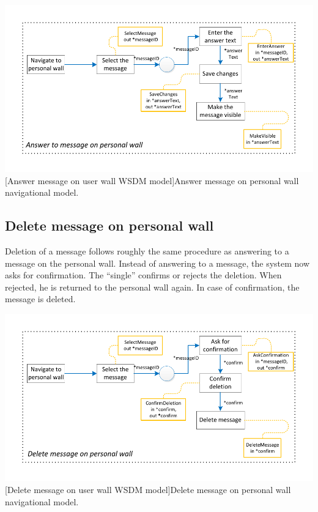 \documentclass[11pt, a4paper,svglistings,oneside]{book}
\begin{document}
$\;$ \\
\noindent\begin{minipage}{\textwidth}
    \centering
   \includegraphics[scale=1]{nav_AnswerMessagePersonalWall.pdf}
 [Answer message on user wall WSDM model]{Answer message on personal wall navigational model.}
\end{minipage}

\subsection{Delete message on personal wall}

Deletion of a message follows roughly the same procedure as answering to a message on the personal wall. Instead of answering to a message, the system now asks for confirmation. The ``single'' confirms or rejects the deletion. When rejected, he is returned to the personal wall again. In case of confirmation, the message is deleted.
$\;$ \\
\noindent\begin{minipage}{\textwidth}
    \centering
   \includegraphics[scale=1]{nav_DeleteMessageOnWall.pdf}
 [Delete message on user wall WSDM model]{Delete message on personal wall navigational model.}
\end{minipage}
\end{document}
